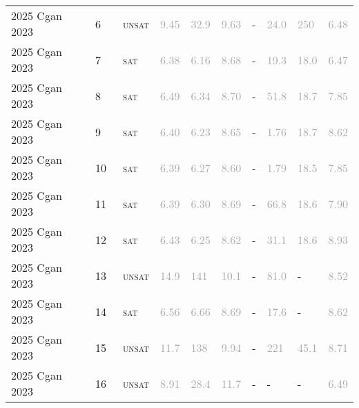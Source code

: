 \begin{center}
{\begin{longtable}{@{}llllllllll@{}}
2025 Cgan 2023 & 6 & ~\textsc{unsat} & \textcolor{darkgray}{9.45} & \textcolor{darkgray}{32.9} & \textcolor{darkgray}{9.63} & - & \textcolor{darkgray}{24.0} & \textcolor{darkgray}{250} & \textcolor{darkgray}{6.48} \\
2025 Cgan 2023 & 7 & ~\textsc{sat} & \textcolor{darkgray}{6.38} & \textcolor{darkgray}{6.16} & \textcolor{darkgray}{8.68} & - & \textcolor{darkgray}{19.3} & \textcolor{darkgray}{18.0} & \textcolor{darkgray}{6.47} \\
2025 Cgan 2023 & 8 & ~\textsc{sat} & \textcolor{darkgray}{6.49} & \textcolor{darkgray}{6.34} & \textcolor{darkgray}{8.70} & - & \textcolor{darkgray}{51.8} & \textcolor{darkgray}{18.7} & \textcolor{darkgray}{7.85} \\
2025 Cgan 2023 & 9 & ~\textsc{sat} & \textcolor{darkgray}{6.40} & \textcolor{darkgray}{6.23} & \textcolor{darkgray}{8.65} & - & \textcolor{darkgray}{1.76} & \textcolor{darkgray}{18.7} & \textcolor{darkgray}{8.62} \\
2025 Cgan 2023 & 10 & ~\textsc{sat} & \textcolor{darkgray}{6.39} & \textcolor{darkgray}{6.27} & \textcolor{darkgray}{8.60} & - & \textcolor{darkgray}{1.79} & \textcolor{darkgray}{18.5} & \textcolor{darkgray}{7.85} \\
2025 Cgan 2023 & 11 & ~\textsc{sat} & \textcolor{darkgray}{6.39} & \textcolor{darkgray}{6.30} & \textcolor{darkgray}{8.69} & - & \textcolor{darkgray}{66.8} & \textcolor{darkgray}{18.6} & \textcolor{darkgray}{7.90} \\
2025 Cgan 2023 & 12 & ~\textsc{sat} & \textcolor{darkgray}{6.43} & \textcolor{darkgray}{6.25} & \textcolor{darkgray}{8.62} & - & \textcolor{darkgray}{31.1} & \textcolor{darkgray}{18.6} & \textcolor{darkgray}{8.93} \\
2025 Cgan 2023 & 13 & ~\textsc{unsat} & \textcolor{darkgray}{14.9} & \textcolor{darkgray}{141} & \textcolor{darkgray}{10.1} & - & \textcolor{darkgray}{81.0} & - & \textcolor{darkgray}{8.52} \\
2025 Cgan 2023 & 14 & ~\textsc{sat} & \textcolor{darkgray}{6.56} & \textcolor{darkgray}{6.66} & \textcolor{darkgray}{8.69} & - & \textcolor{darkgray}{17.6} & - & \textcolor{darkgray}{8.62} \\
2025 Cgan 2023 & 15 & ~\textsc{unsat} & \textcolor{darkgray}{11.7} & \textcolor{darkgray}{138} & \textcolor{darkgray}{9.94} & - & \textcolor{darkgray}{221} & \textcolor{darkgray}{45.1} & \textcolor{darkgray}{8.71} \\
2025 Cgan 2023 & 16 & ~\textsc{unsat} & \textcolor{darkgray}{8.91} & \textcolor{darkgray}{28.4} & \textcolor{darkgray}{11.7} & - & - & - & \textcolor{darkgray}{6.49} \\

\end{longtable}}
\end{center}
